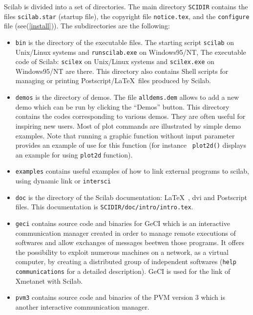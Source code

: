 Scilab is divided into a set of directories. The main directory
\verb!SCIDIR! contains the files {\tt scilab.star} (startup file), the
copyright file {\tt notice.tex}, and the \verb!configure! file
(see(\ref{install})).
The subdirectories are the following:
\begin{itemize}

\item{{\tt bin} is the directory of the executable files.
The starting script {\tt scilab} on Unix/Linux systems and {\tt runscilab.exe} on Windows95/NT, The executable code of Scilab: {\tt scilex} on Unix/Linux systems and {\tt scilex.exe} on Windows95/NT are there. 
This directory also contains Shell scripts 
for managing or printing Postscript/\LaTeX\  files produced by Scilab.}

\item{{\tt demos} is the directory of demos. The file 
{\tt alldems.dem} allows to add a new demo which can be run by 
clicking the ``Demos'' button. 
This directory contains the codes corresponding
to various demos. They are often useful for inspiring new users.
Most of plot commands are illustrated by simple demo examples. 
Note that running a graphic function without input parameter
provides an example of use for this function (for instance {\tt
plot2d()} displays an example for using {\tt plot2d}  function). }

\item{{\tt examples} contains useful examples of how to link
external programs to scilab, using dynamic link or {\tt intersci}}

\item{{\tt doc} is the directory of the Scilab documentation: \LaTeX\ , dvi 
and Postscript files. 
This documentation is {\tt SCIDIR/doc/intro/intro.tex}. }

\item{{\tt geci} contains source code and binaries for GeCI which is an 
interactive communication manager created in order to
manage remote executions of softwares and allow exchanges of messages
beetwen those programs. It offers the possibility to exploit numerous
machines on a network, as a virtual computer, by creating a
distributed group of independent softwares 
(\verb!help communications! for a detailed description).
GeCI is used for the link of Xmetanet with Scilab.}

\item{\tt pvm3} contains source code and binaries of the PVM version
3 which is another interactive communication manager. 


\end{itemize}
